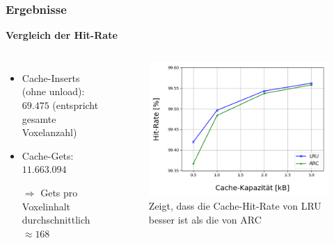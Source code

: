 \documentclass[presentation]{beamer}
\begin{document}
\begin{frame}
\frametitle{Ergebnisse}
\baselineskip
\color{dd-gray} \textbf{Vergleich der Hit-Rate} \color{black}

\begin{columns}[c] %
	\begin{itemize}\space
		\item Cache-Inserts (ohne unload):  \\ $69.475$ (entspricht gesamte Voxelanzahl)
		\item Cache-Gets: \\\space$11.663.094$ 
		\item[$\Rightarrow$] Gets pro Voxelinhalt durchschnittlich $\approx 168$
	\end{itemize}
	\begin{figure}
		\centering
		\includegraphics[width=0.9\linewidth]{figures/results/DensityLimitationHitRates.png}
		\caption{Zeigt, dass die Cache-Hit-Rate von LRU besser ist als die von ARC}
		\label{fig:sub12}
	\end{figure}
\end{columns}
\end{frame}
\end{document}
